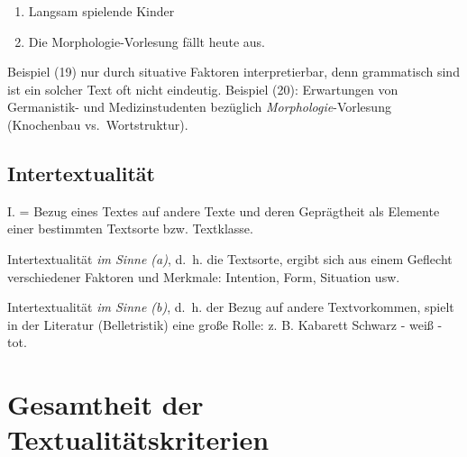 \documentclass[
  letterpaper,
  DIV=11,
  numbers=noendperiod]{scrreprt}
\providecommand{\tightlist}{%
  \setlength{\itemsep}{0pt}\setlength{\parskip}{0pt}}\usepackage{longtable,booktabs,array}
\begin{document}
\begin{enumerate}
\def\labelenumi{(\arabic{enumi})}
\setcounter{enumi}{18}
\tightlist
\item
  Langsam spielende Kinder\\
\item
  Die Morphologie-Vorlesung fällt heute aus.\\
\end{enumerate}

Beispiel (19) nur durch situative Faktoren interpretierbar, denn
grammatisch sind ist ein solcher Text oft nicht eindeutig. Beispiel
(20): Erwartungen von Germanistik- und Medizinstudenten bezüglich
\emph{Morphologie}-Vorlesung (Knochenbau vs.~Wortstruktur).

\hypertarget{intertextualituxe4t}{%
\subsection{Intertextualität}\label{intertextualituxe4t}}

I. = Bezug eines Textes auf andere Texte und deren Geprägtheit als
Elemente einer bestimmten Textsorte bzw. Textklasse.

Intertextualität \emph{im Sinne (a)}, d.~h. die Textsorte, ergibt sich
aus einem Geflecht verschiedener Faktoren und Merkmale: Intention, Form,
Situation usw.

Intertextualität \emph{im Sinne (b)}, d.~h. der Bezug auf andere
Textvorkommen, spielt in der Literatur (Belletristik) eine große Rolle:
z. B. Kabarett Schwarz - weiß - tot.

\hypertarget{gesamtheit-der-textualituxe4tskriterien}{%
\section{Gesamtheit der
Textualitätskriterien}\label{gesamtheit-der-textualituxe4tskriterien}}
\end{document}
